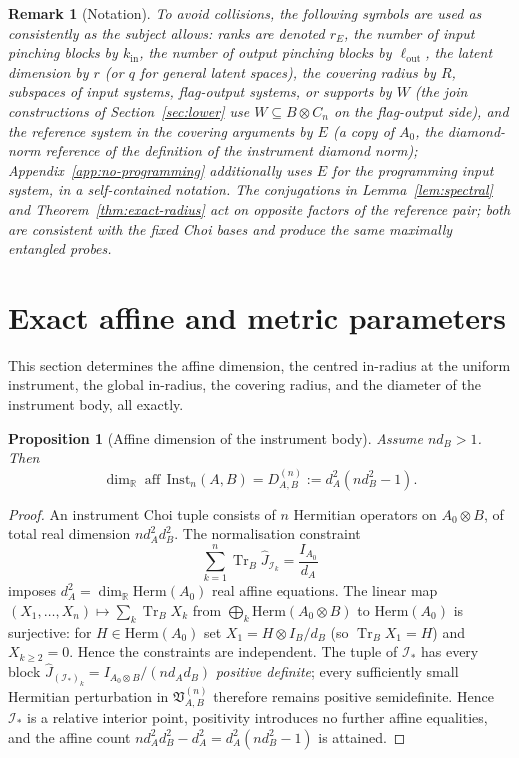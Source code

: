 \documentclass[11pt,a4paper]{article}
\newtheorem{proposition}[theorem]{Proposition}
\newtheorem{remark}[theorem]{Remark}
\newcommand{\Herm}{\mathrm{Herm}}
\newcommand{\Inst}{\mathrm{Inst}}
\newcommand{\Tr}{\operatorname{Tr}}
\newcommand{\Jhat}{\widehat J}
\newcommand{\aff}{\operatorname{aff}}
\begin{document}
\begin{remark}[Notation]
\label{rem:notation}
To avoid collisions, the following symbols are used as consistently as the subject allows: ranks are denoted $r_E$, the number of input pinching blocks by $k_{\mathrm{in}}$, the number of output pinching blocks by $\ell_{\mathrm{out}}$, the latent dimension by $r$ (or $q$ for general latent spaces), the covering radius by $R$, subspaces of input systems, flag-output systems, or supports by $W$ (the join constructions of Section~\ref{sec:lower} use $W\subseteq B\otimes C_n$ on the flag-output side), and the reference system in the covering arguments by $E$ (a copy of $A_0$, the diamond-norm reference of the definition of the instrument diamond norm); Appendix~\ref{app:no-programming} additionally uses $E$ for the programming input system, in a self-contained notation. The conjugations in Lemma~\ref{lem:spectral} and Theorem~\ref{thm:exact-radius} act on opposite factors of the reference pair; both are consistent with the fixed Choi bases and produce the same maximally entangled probes.
\end{remark}

\section{Exact affine and metric parameters}
\label{sec:exact-geometry}

This section determines the affine dimension, the centred in-radius at the uniform instrument, the global in-radius, the covering radius, and the diameter of the instrument body, all exactly.

\begin{proposition}[Affine dimension of the instrument body]
\label{prop:dimension}
Assume $nd_B>1$. Then
\[
\dim_{\mathbb R}\aff\,\Inst_n(A,B)
=D_{A,B}^{(n)}:=d_A^2(nd_B^2-1).
\]
\end{proposition}

\begin{proof}
An instrument Choi tuple consists of $n$ Hermitian operators on $A_0\otimes B$, of total real dimension $nd_A^2d_B^2$. The normalisation constraint
\[
\sum_{k=1}^n\Tr_B\Jhat_{\mathcal I_k}=\frac{I_{A_0}}{d_A}
\]
imposes $d_A^2=\dim_{\mathbb R}\Herm(A_0)$ real affine equations. The linear map $(X_1,\dots,X_n)\mapsto\sum_k\Tr_BX_k$ from $\bigoplus_k\Herm(A_0\otimes B)$ to $\Herm(A_0)$ is surjective: for $H\in\Herm(A_0)$ set $X_1=H\otimes I_B/d_B$ (so $\Tr_BX_1=H$) and $X_{k\ge2}=0$. Hence the constraints are independent. The tuple of $\mathcal I_*$ has every block $\Jhat_{(\mathcal I_*)_k}=I_{A_0\otimes B}/(nd_Ad_B)$ \emph{positive definite}; every sufficiently small Hermitian perturbation in $\mathfrak V_{A,B}^{(n)}$ therefore remains positive semidefinite. Hence $\mathcal I_*$ is a relative interior point, positivity introduces no further affine equalities, and the affine count $nd_A^2d_B^2-d_A^2=d_A^2(nd_B^2-1)$ is attained.
\end{proof}
\end{document}
